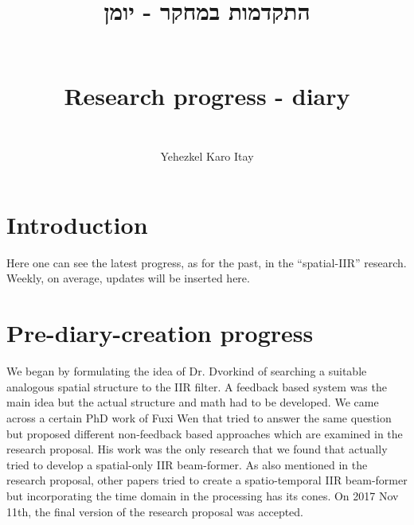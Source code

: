 \documentclass[12pt]{article}
\title{
\begin{otherlanguage}{hebrew}
התקדמות במחקר - יומן
\end{otherlanguage}
\\
Research progress - diary
}
\author{
\\Yehezkel Karo Itay
}
\begin{document}
\maketitle
\section*{Introduction}
Here one can see the latest progress, as for the past, in the ``spatial-IIR'' research. Weekly, on average, updates will be inserted here.
\section*{Pre-diary-creation progress}
We began by formulating the idea of Dr. Dvorkind of searching a suitable analogous spatial structure to the IIR filter.
A feedback based system was the main idea but the actual structure and math had to be developed.
We came across a certain PhD work \cite{van1988beamforming} of Fuxi Wen that tried to answer the same question but proposed different non-feedback based approaches which are examined in the research proposal.
His work was the only research that we found that actually tried to develop a spatial-only IIR beam-former.
As also mentioned in the research proposal, other papers \cite{Madanayake2008ABeamformer,Madanayake2009SystolicWDFs,Madanayake2008AFilters,Bruton2003Three-dimensionalBanks,Ward1986ABeamforming,Joshi2012SynthesisApplications} tried to create a spatio-temporal IIR beam-former but incorporating the time domain in the processing has its cones.
On 2017 Nov 11th, the final version of the research proposal was accepted.
\end{document}
